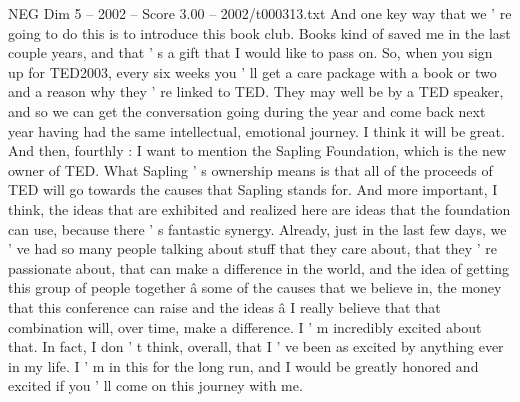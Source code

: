 \begin{textsample}{NEG Dim 5 – 2002 – Score 3.00 – 2002/t000313.txt}
And one key way that we ' re going to do this is to introduce this book club.
Books kind of saved me in the last couple years, and that ' s a gift that I would like to pass on.
So, when you sign up for TED2003, every six weeks you ' ll get a care package with a book or two and a reason why they ' re linked to TED.
They may well be by a TED speaker, and so we can get the conversation going during the year and come back next year having had the same intellectual, emotional journey.
I think it will be great.
And then, fourthly : I want to mention the Sapling Foundation, which is the new owner of TED.
What Sapling ' s ownership means is that all of the proceeds of TED will go towards the causes that Sapling stands for.
And more important, I think, the ideas that are exhibited and realized here are ideas that the foundation can use, because there ' s fantastic synergy.
Already, just in the last few days, we ' ve had so many people talking about stuff that they care about, that they ' re passionate about, that can make a difference in the world, and the idea of getting this group of people together â some of the causes that we believe in, the money that this conference can raise and the ideas â I really believe that that combination will, over time, make a difference.
I ' m incredibly excited about that.
In fact, I don ' t think, overall, that I ' ve been as excited by anything ever in my life.
I ' m in this for the long run, and I would be greatly honored and excited if you ' ll come on this journey with me.

\end{textsample}

